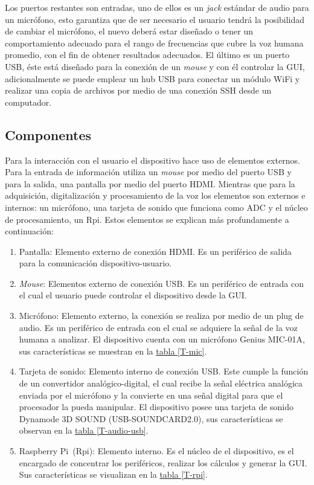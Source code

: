 \documentclass[11pt,lettersize]{article} %
\newcommand{\tabla}[1]{\hyperref[{#1}]{tabla \ref*{#1}}}
\begin{document}
Los puertos restantes son entradas, uno de ellos es un \textit{jack} estándar de audio para un micrófono, esto garantiza que de ser necesario el usuario tendrá la posibilidad de cambiar el micrófono, el nuevo deberá estar diseñado o tener un comportamiento adecuado para el rango de frecuencias que cubre la voz humana promedio, con el fin de obtener resultados adecuados. El último es un puerto USB, éste está diseñado para la conexión de un \textit{mouse} y con él controlar la GUI, adicionalmente se puede emplear un hub USB para conectar un módulo WiFi y realizar una copia de archivos por medio de una conexión SSH desde un computador.


\subsection{Componentes}
Para la interacción con el usuario el dispositivo hace uso de elementos externos. Para la entrada de información utiliza un \textit{mouse} por medio del puerto USB y para la salida, una pantalla por medio del puerto HDMI. Mientras que para la adquisición, digitalización y procesamiento de la voz los elementos son externos e internos: un micrófono, una tarjeta de sonido que funciona como ADC y el núcleo de procesamiento, un Rpi. Estos elementos se explican más profundamente a continuación:

\begin{enumerate}
	\item Pantalla: Elemento externo de conexión HDMI. Es un periférico de salida para la comunicación dispositivo-usuario.
	\item \textit{Mouse}: Elementos externo de conexión USB. Es un periférico de entrada con el cual el usuario puede controlar el dispositivo desde la GUI.
	\item Micrófono: Elemento externo, la conexión se realiza por medio de un plug de audio. Es un periférico de entrada con el cual se adquiere la señal de la voz humana a analizar. El dispositivo cuenta con un micrófono Genius MIC-01A, sus características se muestran en la \tabla{T-mic}.
	\item Tarjeta de sonido: Elemento interno de conexión USB. Este cumple la función de un convertidor analógico-digital, el cual recibe la señal eléctrica analógica enviada por el micrófono y la convierte en una señal digital para que el procesador la pueda manipular. El dispositivo posee una tarjeta de sonido Dynamode 3D SOUND (USB-SOUNDCARD2.0), sus características se observan en la \tabla{T-audio-usb}.
	\item Raspberry Pi\textregistered\ (Rpi): Elemento interno. Es el núcleo de el dispositivo, es el encargado de concentrar los periféricos, realizar los cálculos y generar la GUI. Sus características se visualizan en la \tabla{T-rpi}.
\end{enumerate}
\end{document}
